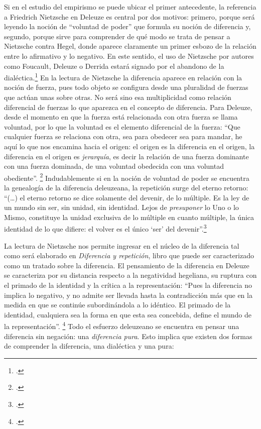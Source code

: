 Si en el estudio del empirismo se puede ubicar el primer antecedente, la referencia a Friedrich Nietzsche en Deleuze es central por dos motivos: primero, porque será leyendo la noción de \enquote{voluntad de poder} que formula su noción de diferencia y, segundo, porque sirve para comprender de qué modo se trata de pensar a Nietzsche contra Hegel, donde aparece claramente un primer esbozo de la relación entre lo afirmativo y lo negativo. En este sentido, el uso de Nietzsche por autores como Foucault, Deleuze o Derrida estará signado por el abandono de la dialéctica.\footcite{@6973-SAZBON2009,@6974-CASTRO2002} En la lectura de Nietzsche la diferencia aparece en relación con la noción de fuerza, pues todo objeto se configura desde una pluralidad de fuerzas que actúan unas sobre otras. No será sino esa multiplicidad como relación diferencial de fuerzas lo que aparezca en el concepto de diferencia. Para Deleuze, desde el momento en que la fuerza está relacionada con otra fuerza se llama voluntad, por lo que la voluntad es el elemento diferencial de la fuerza: \enquote{Que cualquier fuerza se relaciona con otra, sea para obedecer sea para mandar, he aquí lo que nos encamina hacia el origen: el origen es la diferencia en el origen, la diferencia en el origen es \emph{jerarquía}, es decir la relación de una fuerza dominante con una fuerza dominada, de una voluntad obedecida con una voluntad obediente}. \footcite[]{@6975-DELEUZE1998} Indudablemente si en la noción de voluntad de poder se encuentra la genealogía de la diferencia deleuzeana, la repetición surge del eterno retorno: \enquote{(\ldots) el eterno retorno se dice solamente del devenir, de lo múltiple. Es la ley de un mundo sin ser, sin unidad, sin identidad. Lejos \linebreak  de \emph{presuponer} lo Uno o lo Mismo, constituye la unidad exclusiva de lo múltiple en cuanto múltiple, la única identidad de lo que difiere: el volver es el único \enquote{ser} del devenir}.\footcite[16]{@6977-DELEUZE2005}

La lectura de Nietzsche nos permite ingresar en el núcleo de la diferencia tal como será elaborado en \emph{Diferencia y repetición}, libro que puede ser caracterizado como un tratado sobre la diferencia. El pensamiento de la diferencia en Deleuze se caracteriza por su distancia respecto a la negatividad hegeliana, su ruptura con el primado de la identidad y la crítica a la representación: \enquote{Pues la diferencia no implica lo negativo, y no admite ser llevada hasta  \linebreak la contradicción más que en la medida en que se continúe subordinándola a lo idéntico. El primado de la identidad, cualquiera sea la forma en que esta sea concebida, define el mundo de la representación}. \footcite[15]{@6961-DELEUZE2002} Todo el esfuerzo deleuzeano se encuentra en pensar una diferencia sin negación: una \emph{diferencia pura}. Esto implica que existen dos formas de comprender la diferencia, una dialéctica y una pura:

